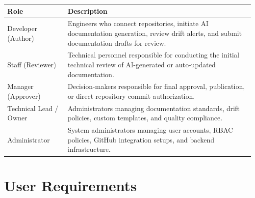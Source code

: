 \begin{longtable}{p{4.5cm} p{9cm}}
	\toprule
	\textbf{Role} & \textbf{Description} \\
	\midrule
	\endhead
	
	Developer (Author) &
	Engineers who connect repositories, initiate AI documentation generation, review drift alerts, and submit documentation drafts for review. \\
	
	Staff (Reviewer) &
	Technical personnel responsible for conducting the initial technical review of AI-generated or auto-updated documentation. \\
	
	Manager (Approver) &
	Decision-makers responsible for final approval, publication, or direct repository commit authorization. \\
	
	Technical Lead / Owner &
	Administrators managing documentation standards, drift policies, custom templates, and quality compliance. \\
	
	Administrator &
	System administrators managing user accounts, RBAC policies, GitHub integration setups, and backend infrastructure. \\
	
	\bottomrule
\end{longtable}

\section{User Requirements}

